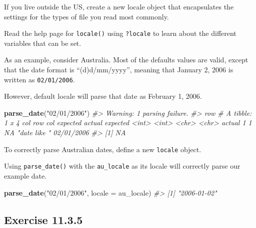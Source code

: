 \documentclass[]{book}
\newenvironment{Shaded}{\begin{snugshade}}{\end{snugshade}}
\newcommand{\CommentTok}[1]{\textcolor[rgb]{0.56,0.35,0.01}{\textit{#1}}}
\newcommand{\DataTypeTok}[1]{\textcolor[rgb]{0.13,0.29,0.53}{#1}}
\newcommand{\KeywordTok}[1]{\textcolor[rgb]{0.13,0.29,0.53}{\textbf{#1}}}
\newcommand{\NormalTok}[1]{#1}
\newcommand{\StringTok}[1]{\textcolor[rgb]{0.31,0.60,0.02}{#1}}
\theoremstyle{plain}
\theoremstyle{remark}
\theoremstyle{definition}
\theoremstyle{definition}
\theoremstyle{definition}
\theoremstyle{remark}
\begin{document}
If you live outside the US, create a new locale object that encapsulates
the settings for the types of file you read most commonly.

Read the help page for \texttt{locale()} using \texttt{?locale} to learn
about the different variables that can be set.

As an example, consider Australia. Most of the defaults values are
valid, except that the date format is ``(d)d/mm/yyyy'', meaning that
January 2, 2006 is written as \texttt{02/01/2006}.

However, default locale will parse that date as February 1, 2006.

\begin{Shaded}
\begin{Highlighting}[]
\KeywordTok{parse_date}\NormalTok{(}\StringTok{"02/01/2006"}\NormalTok{)}
\CommentTok{#> Warning: 1 parsing failure.}
\CommentTok{#> row # A tibble: 1 x 4 col     row   col expected     actual     expected   <int> <int> <chr>        <chr>      actual 1     1    NA "date like " 02/01/2006}
\CommentTok{#> [1] NA}
\end{Highlighting}
\end{Shaded}

To correctly parse Australian dates, define a new \texttt{locale}
object.

\begin{Shaded}
\end{Shaded}

Using \texttt{parse\_date()} with the \texttt{au\_locale} as its locale
will correctly parse our example date.

\begin{Shaded}
\begin{Highlighting}[]
\KeywordTok{parse_date}\NormalTok{(}\StringTok{"02/01/2006"}\NormalTok{, }\DataTypeTok{locale =}\NormalTok{ au_locale)}
\CommentTok{#> [1] "2006-01-02"}
\end{Highlighting}
\end{Shaded}

\hypertarget{exercise-11.3.5}{%
\subsection*{\texorpdfstring{Exercise
{11.3.5}}{Exercise 11.3.5}}\label{exercise-11.3.5}}
\end{document}
